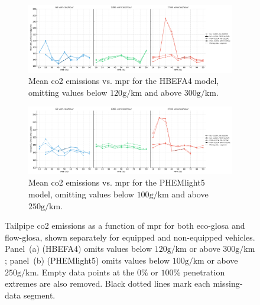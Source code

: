 \begin{figure}[htb]
  \centering
  \begin{subfigure}[b]{0.98\textwidth}
    \includegraphics[width=\textwidth]{data/img/Emissions/EmissionsHBEFA4Combinded.pdf}
    \caption{Mean \ac{co2} emissions vs. \ac{mpr} for the HBEFA4 model, omitting values below $120\unit{\gram\per\kilo\metre}$ and above $300\unit{\gram\per\kilo\metre}$.}
    \label{fig:Emissions_HBEFA4_Trimmed}
  \end{subfigure}\hfill
  \begin{subfigure}[b]{0.98\textwidth}
    \includegraphics[width=\textwidth]{data/img/Emissions/EmissionsPHEMlight5Combinded.pdf}
    \caption{Mean \ac{co2} emissions vs. \ac{mpr} for the PHEMlight5 model, omitting values below $100\unit{\gram\per\kilo\metre}$ and above $250\unit{\gram\per\kilo\metre}$.}
    \label{fig:Emissions_PHEMlight5_Trimmed}
  \end{subfigure}  
  \caption[Trimmed \ac{co2} emissions vs. \ac{mpr}]{Tailpipe \ac{co2} emissions as a function of \ac{mpr} for both \ac{eco-glosa} and \ac{flow-glosa}, shown separately for equipped and non-equipped vehicles. Panel~(a) (HBEFA4) omits values below $120\unit{\gram\per\kilo\metre}$ or above $300\unit{\gram\per\kilo\metre}$; panel~(b) (PHEMlight5) omits values below $100\unit{\gram\per\kilo\metre}$ or above $250\unit{\gram\per\kilo\metre}$. Empty data points at the $0\%$ or $100\%$ penetration extremes are also removed. Black dotted lines mark each missing‐data segment.}
  \label{fig:Emissions_Trimmed}
\end{figure}

